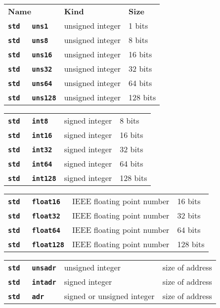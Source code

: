 \documentclass[12pt]{article}
\makeatletter
\newcommand{\TT}[1]{{\tt \bfseries #1}}
\newcommand{\ttkey}[1]{\TT{#1}\index{#1@{\tt #1}}}
\newenvironment{indpar}[1][0.3in]%
	{\begin{list}{}%
		     {\setlength{\itemsep}{0in}%
		      \setlength{\topsep}{0in}%
		      \setlength{\parsep}{1ex}%
		      \setlength{\labelwidth}{#1}%
		      \setlength{\leftmargin}{#1}%
		      \addtolength{\leftmargin}{\labelsep}}%
	 \item}%
	{\end{list}}
\makeatother
\begin{document}
\begin{indpar}
\begin{tabular}{p{1.5in}@{~~~~~~}p{2in}@{~~~~~~}l}
\bf Name & \bf Kind & \bf Size \\[2ex]
\TT{std}~~~\ttkey{uns1}		& unsigned integer & 1 bits \\
\TT{std}~~~\ttkey{uns8}		& unsigned integer & 8 bits \\
\TT{std}~~~\ttkey{uns16}	& unsigned integer & 16 bits \\
\TT{std}~~~\ttkey{uns32}	& unsigned integer & 32 bits \\
\TT{std}~~~\ttkey{uns64}	& unsigned integer & 64 bits \\
\TT{std}~~~\ttkey{uns128}	& unsigned integer & 128 bits
\end{tabular}

\begin{tabular}{p{1.5in}@{~~~~~~}p{2in}@{~~~~~~}l}
\TT{std}~~~\ttkey{int8}		& signed integer & 8 bits \\
\TT{std}~~~\ttkey{int16}	& signed integer & 16 bits \\
\TT{std}~~~\ttkey{int32}	& signed integer & 32 bits \\
\TT{std}~~~\ttkey{int64}	& signed integer & 64 bits \\
\TT{std}~~~\ttkey{int128}	& signed integer & 128 bits
\end{tabular}

\begin{tabular}{p{1.5in}@{~~~~~~}p{2in}@{~~~~~~}l}
\TT{std}~~~\ttkey{float16}	& IEEE floating point number & 16 bits \\
\TT{std}~~~\ttkey{float32}	& IEEE floating point number & 32 bits \\
\TT{std}~~~\ttkey{float64}	& IEEE floating point number & 64 bits \\
\TT{std}~~~\ttkey{float128}	& IEEE floating point number & 128 bits
\end{tabular}

\begin{tabular}{p{1.5in}@{~~~~~~}p{2in}@{~~~~~~}l}
\TT{std}~~~\ttkey{unsadr}	& unsigned integer & size of address \\
\TT{std}~~~\ttkey{intadr}	& signed integer & size of address \\
\TT{std}~~~\ttkey{adr}		& signed or unsigned integer
                                & size of address \\
\end{tabular}


\end{indpar}
\end{document}
